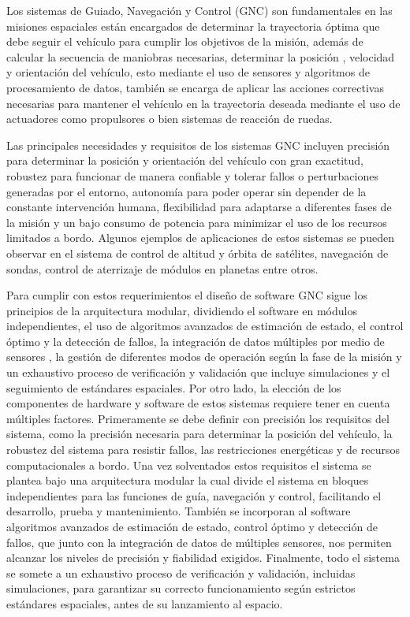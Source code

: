 \documentclass[12pt]{article}
\begin{document}
Los sistemas de Guiado, Navegación y Control (GNC) son fundamentales en las misiones espaciales están encargados de determinar la trayectoria óptima que debe seguir el vehículo para cumplir los objetivos de la misión, además de calcular la secuencia de maniobras necesarias, determinar la posición , velocidad y orientación del vehículo, esto mediante el uso de sensores y algoritmos de procesamiento de datos, también se encarga de aplicar las acciones correctivas necesarias para mantener el vehículo en la trayectoria deseada mediante el uso de actuadores como propulsores o bien sistemas de reacción de ruedas. 

Las principales necesidades y requisitos de los sistemas GNC incluyen precisión para determinar la posición y orientación del vehículo con gran exactitud, robustez para funcionar de manera confiable y tolerar fallos o perturbaciones generadas por el entorno, autonomía para poder operar sin depender de la constante intervención humana, flexibilidad para adaptarse a diferentes fases de la misión y un bajo consumo de potencia para minimizar el uso de los recursos limitados a bordo. Algunos ejemplos de aplicaciones de estos sistemas se pueden observar en el sistema de control de altitud y órbita de satélites, navegación de sondas, control de aterrizaje de módulos en planetas entre otros.

Para cumplir con estos requerimientos el diseño de software GNC sigue los principios de la arquitectura modular, dividiendo el software en módulos independientes, el uso de algoritmos avanzados de estimación de estado, el control óptimo y la detección de fallos, la integración  de datos múltiples por medio de sensores , la gestión de diferentes modos de operación según la fase de la misión y un exhaustivo proceso de verificación y validación que incluye simulaciones y el seguimiento de estándares espaciales. Por otro lado, la elección de los componentes de hardware y software de estos sistemas requiere tener en cuenta múltiples factores. Primeramente se debe definir con precisión los requisitos del sistema, como la precisión necesaria para determinar la posición del vehículo, la robustez del sistema para resistir fallos, las restricciones energéticas y de recursos computacionales a bordo. Una vez solventados estos requisitos el sistema se plantea bajo una arquitectura modular la cual divide el sistema en bloques independientes para las funciones de guía, navegación y control, facilitando el desarrollo, prueba y mantenimiento. También se incorporan al software algoritmos avanzados de estimación de estado, control óptimo y detección de fallos, que junto con la integración de datos de múltiples sensores, nos permiten alcanzar los niveles de precisión y fiabilidad exigidos. Finalmente, todo el sistema se somete a un exhaustivo proceso de verificación y validación, incluidas simulaciones, para garantizar su correcto funcionamiento según estrictos estándares espaciales, antes de su lanzamiento al espacio.
\end{document}
